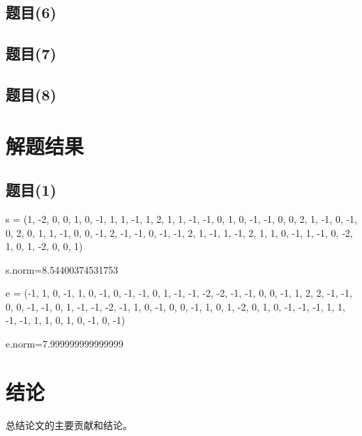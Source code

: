\documentclass[12pt,a4paper]{article}
\numberwithin{equation}{section}
\begin{document}
\subsection{题目(6)}

\subsection{题目(7)}

\subsection{题目(8)}

\section{解题结果}

\subsection{题目(1)}


s = (1, -2, 0, 0, 1, 0, -1, 1, 1, -1, 1, 2, 1, 1,
-1, -1, 0, 1, 0, -1, -1, 0, 0, 2, 1, -1, 0, -1, 0, 2, 0, 1,
1, -1, 0, 0, -1, 2, -1, -1, 0, -1, -1, 2, 1, -1, 1, -1, 2, 1, 1, 0,
-1, 1, -1, 0, -2, 1, 0, 1, -2, 0, 0, 1)

s.norm=8.54400374531753

\hspace*{\fill}

e = (-1, 1, 0, -1, 1, 0, -1, 0, -1, -1, 0, 1, -1, -1, -2, -2, -1, -1, 0, 0, -1, 1, 2, 2, -1,
-1, 0, 0, -1, -1, 0, 1, -1, -1, -2, -1, 1, 0, -1, 0, 0, -1, 1, 0, 1, -2, 0, 1, 0, -1, -1,
-1, 1, 1, -1, -1, 1, 1, 0, 1, 0, -1, 0, -1)

e.norm=7.999999999999999

\section{结论}

总结论文的主要贡献和结论。
\end{document}
